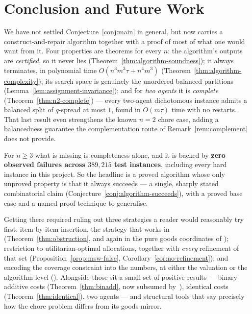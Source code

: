 \section{Conclusion and Future Work}
\label{sec:conclusion}

We have not settled Conjecture~\ref{conj:main} in general, but
 now carries a construct-and-repair algorithm together with
a proof of most of what one would want from it. Four properties are theorems
for every $n$: the algorithm's outputs are \emph{certified}, so it never lies
(Theorem~\ref{thm:algorithm-soundness}); it always terminates, in polynomial
time $O(n^3m^3\tau + n^4m^3)$ (Theorem~\ref{thm:algorithm-complexity}); its
search space is genuinely the unordered balanced partitions
(Lemma~\ref{lem:assignment-invariance}); and for \emph{two agents} it is
\emph{complete} (Theorem~\ref{thm:n2-complete}) --- every two-agent dichotomous
instance admits a balanced split of $q$-spread at most $1$, found in
$O(m\tau)$ time with no restarts. That last result even strengthens the known
$n = 2$ chore case, adding a balancedness guarantee the complementation route
of Remark~\ref{rem:complement} does not provide.

For $n \ge 3$ what is missing is completeness alone, and it is backed by
\textbf{zero observed failures across $389{,}215$ test instances}, including
every hard instance in this project. So the headline is a proved algorithm
whose only unproved property is that it always succeeds --- a single, sharply
stated combinatorial claim (Conjecture~\ref{conj:algorithm-succeeds}), with a
proved base case and a named proof technique to generalise.

Getting there required ruling out three strategies a reader would reasonably try
first: item-by-item insertion, the strategy that works in~\cite{BKNS22}
(Theorem~\ref{thm:obstruction}, and again in the pure goods coordinates of
); restriction to utilitarian-optimal
allocations, together with \emph{every} refinement of that set
(Proposition~\ref{prop:msw-false}, Corollary~\ref{cor:no-refinement}); and
encoding the coverage constraint into the numbers, at either the valuation or
the algorithm level (). Alongside those sit a small set of
positive results --- binary additive costs (Theorem~\ref{thm:binadd}, now
subsumed by~\cite{LMS26}), identical costs (Theorem~\ref{thm:identical}), two
agents --- and structural tools that say precisely how the chore problem differs
from its goods mirror.

